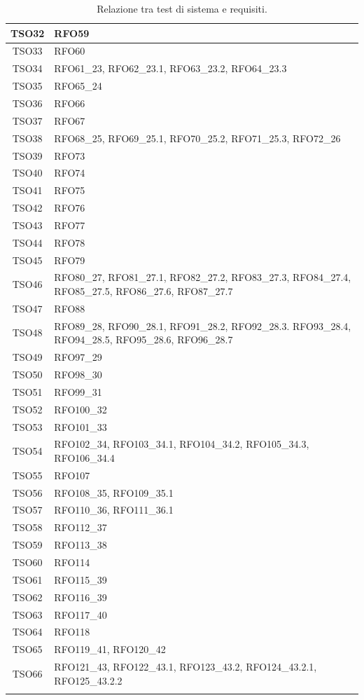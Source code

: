\begin{longtable}{|c| C{13cm}|}
	TSO32 & RFO59\\ \hline
	TSO33 & RFO60\\ \hline
	TSO34 & RFO61\_23, RFO62\_23.1, RFO63\_23.2, RFO64\_23.3\\ \hline
	TSO35 & RFO65\_24\\ \hline
	TSO36 & RFO66\\ \hline
	TSO37 & RFO67\\ \hline
	TSO38 & RFO68\_25, RFO69\_25.1, RFO70\_25.2, RFO71\_25.3, RFO72\_26\\ \hline
	TSO39 & RFO73\\ \hline
	TSO40 & RFO74\\ \hline
	TSO41 & RFO75\\ \hline
	TSO42 & RFO76\\ \hline
	TSO43 & RFO77\\ \hline
	TSO44 & RFO78\\ \hline
	TSO45 & RFO79\\ \hline
	TSO46 & RFO80\_27, RFO81\_27.1, RFO82\_27.2, RFO83\_27.3, RFO84\_27.4, RFO85\_27.5, RFO86\_27.6, RFO87\_27.7\\ \hline
	TSO47 & RFO88\\ \hline
	TSO48 & RFO89\_28, RFO90\_28.1, RFO91\_28.2, RFO92\_28.3. RFO93\_28.4, RFO94\_28.5, RFO95\_28.6, RFO96\_28.7\\ \hline
	TSO49 & RFO97\_29\\ \hline
	TSO50 & RFO98\_30\\ \hline
	TSO51 & RFO99\_31\\ \hline
	TSO52 & RFO100\_32\\ \hline
	TSO53 & RFO101\_33\\ \hline
	TSO54 & RFO102\_34, RFO103\_34.1, RFO104\_34.2, RFO105\_34.3, RFO106\_34.4\\ \hline
	TSO55 & RFO107\\ \hline
	TSO56 & RFO108\_35, RFO109\_35.1\\ \hline
	TSO57 & RFO110\_36, RFO111\_36.1\\ \hline
	TSO58 & RFO112\_37\\ \hline
	TSO59 & RFO113\_38\\ \hline
	TSO60 & RFO114\\ \hline
	TSO61 & RFO115\_39\\ \hline
	TSO62 & RFO116\_39\\ \hline
	TSO63 & RFO117\_40\\ \hline
	TSO64 & RFO118\\ \hline
	TSO65 & RFO119\_41, RFO120\_42\\ \hline
	TSO66 & RFO121\_43, RFO122\_43.1, RFO123\_43.2, RFO124\_43.2.1, RFO125\_43.2.2\\ \hline
	\caption{Relazione tra test di sistema e requisiti.}\\
\end{longtable}
